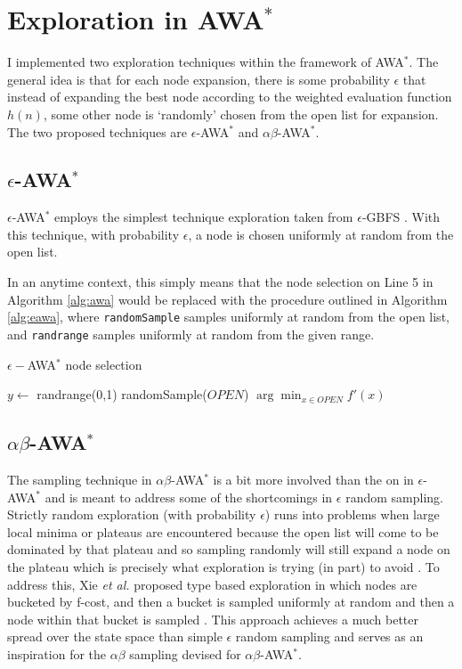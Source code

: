 \section{Exploration in AWA$^*$}
I implemented two exploration techniques within the framework of AWA$^*$. The general idea is that for each node expansion, there is some probability $\epsilon$ that instead of expanding the best node according to the weighted evaluation function $h(n)$, some other node is `randomly' chosen from the open list for expansion. The two proposed techniques are $\epsilon$-AWA$^*$ and  $\alpha \beta$-AWA$^*$.

\subsection{$\epsilon$-AWA$^*$}
$\epsilon$-AWA$^*$ employs the simplest technique exploration taken from $\epsilon$-GBFS \cite{valenzano2016completeness}\cite{valenzano2014comparison}. With this technique, with probability $\epsilon$, a node is chosen uniformly at random from the open list.

In an anytime context, this simply means that the node selection on Line 5 in Algorithm \ref{alg:awa} would be replaced with the procedure outlined in Algorithm \ref{alg:eawa}, where \texttt{randomSample} samples uniformly at random from the open list, and \texttt{randrange} samples uniformly at random from the given range.

\begin{algorithm}
\caption{$\epsilon-$AWA$^*$ node selection}\label{alg:eawa}
\begin{algorithmic}
\State $y \gets $ randrange(0,1)
    \State\Return randomSample($OPEN$)
\Else{}
    \State\Return $\arg \min_{x \in OPEN} f'(x)$
\EndIf
\end{algorithmic}
\end{algorithm}

\subsection{$\alpha \beta$-AWA$^*$}
The sampling technique in $\alpha \beta$-AWA$^*$ is a bit more involved than the on in $\epsilon$-AWA$^*$ and is meant to address some of the shortcomings in $\epsilon$ random sampling. Strictly random exploration (with probability $\epsilon$) runs into problems when large local minima or plateaus are encountered because the open list will come to be dominated by that plateau and so sampling randomly will still expand a node on the plateau which is precisely what exploration is trying (in part) to avoid \cite{xie2014type}\cite{cohen2021type}. To address this, Xie \textit{et al.} proposed type based exploration in which nodes are bucketed by f-cost, and then a bucket is sampled uniformly at random and then a node within that bucket is sampled \cite{xie2014type}. This approach achieves a much better spread over the state space than simple $\epsilon$ random sampling \cite{xie2014type} and serves as an inspiration for the $\alpha \beta$ sampling devised for $\alpha \beta$-AWA$^*$. 

